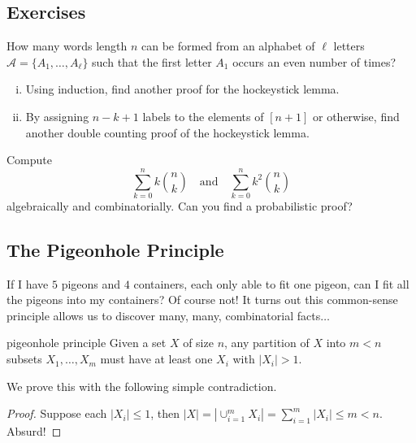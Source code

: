 \documentclass{article}
\newcounter{statementcount}
\begin{document}
\subsection*{Exercises}

\begin{exercise}[]{}
    How many words length $n$ can be formed from an alphabet of $\ell$ letters $\mathcal{A} = \{A_1, \dots, A_\ell\}$ such that the first letter 
    $A_1$ occurs an even number of times?
\end{exercise}

\begin{exercise}[]{}
    \begin{enumerate}[(i)]
        \item Using induction, find another proof for the hockeystick lemma.
        \item By assigning $n-k+1$ labels to the elements of $[n+1]$ or otherwise, find another double counting 
        proof of the hockeystick lemma.
    \end{enumerate} 
\end{exercise}

\begin{exercise}[]{} 
    Compute \[\sum_{k=0}^n k\binom{n}{k} \quad \text{and} \quad \sum_{k=0}^n k^2\binom{n}{k}\] 
    algebraically and combinatorially. Can you find a probabilistic proof? 
\end{exercise}

\subsection{The Pigeonhole Principle}

\setcounter{statementcount}{1}

If I have $5$ pigeons and $4$ containers, each only able to fit one pigeon, can I fit all the pigeons into my containers? Of course not! It turns 
out this common-sense principle allows us to discover many, many, combinatorial facts$\dots$

\begin{theorem}[]{pigeonhole principle}
    Given a set $X$ of size $n$, any partition of $X$ into $m < n$ subsets $X_1, \dots, X_m$ must have at least one $X_i$ with $|X_i| > 1$. 
\end{theorem}

We prove this with the following simple contradiction. 

\begin{proof}
    Suppose each $|X_i| \leq 1$, then $|X| = |\cup_{i=1}^m X_i| = \sum_{i=1}^m |X_i| \leq m < n$. Absurd!
\end{proof}
\end{document}
